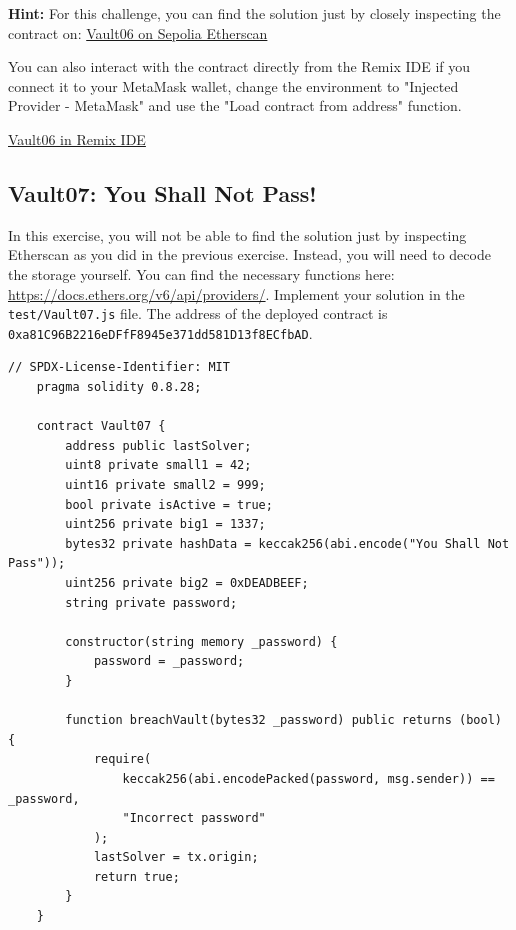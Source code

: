 \documentclass[12pt]{article}
\begin{document}
\medskip
\noindent
\textbf{Hint:} For this challenge, you can find the solution just by closely inspecting the contract on: \href{https://sepolia.etherscan.io/address/0xA3a763bF62550511A0E485d6EB16c98937609A32}{Vault06 on Sepolia Etherscan}

\medskip
\noindent
You can also interact with the contract directly from the Remix IDE if you connect it to your MetaMask wallet, change the environment to "Injected Provider - MetaMask" and use the "Load contract from address" function.

\medskip
\noindent
\href{https://remix.ethereum.org/?#activate=solidity&url=https://github.com/radovluk/unbreakable-vault/contracts/Vault06.sol&lang=en&optimize=false&runs=200&evmVersion=null&version=soljson-v0.8.28+commit.7893614a.js}{Vault06 in Remix IDE}

\subsection*{Vault07: You Shall Not Pass!}

\noindent
In this exercise, you will not be able to find the solution just by inspecting Etherscan as you did in the previous exercise. Instead, you will need to decode the storage yourself. You can find the necessary functions here: \href{https://docs.ethers.org/v6/api/providers/}{https://docs.ethers.org/v6/api/providers/}. Implement your solution in the \texttt{test/Vault07.js} file. The address of the deployed contract is \texttt{0xa81C96B2216eDFfF8945e371dd581D13f8ECfbAD}.

\begin{lstlisting}[language=Solidity]
    // SPDX-License-Identifier: MIT
    pragma solidity 0.8.28;
    
    contract Vault07 {
        address public lastSolver;
        uint8 private small1 = 42;
        uint16 private small2 = 999;
        bool private isActive = true;
        uint256 private big1 = 1337;
        bytes32 private hashData = keccak256(abi.encode("You Shall Not Pass"));
        uint256 private big2 = 0xDEADBEEF;
        string private password;
    
        constructor(string memory _password) {
            password = _password;
        }
    
        function breachVault(bytes32 _password) public returns (bool) {
            require(
                keccak256(abi.encodePacked(password, msg.sender)) == _password,
                "Incorrect password"
            );
            lastSolver = tx.origin;
            return true;
        }
    }
\end{lstlisting}
\end{document}
